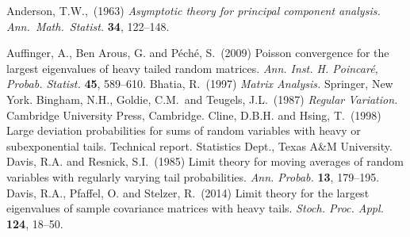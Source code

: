 \documentclass[11pt,reqno]{amsart}
\newcommand{\1}{\mathds{1}}
\newcommand{\0}{\boldsymbol{0}}
\newcommand{\4}{\mathchoice{\mskip1.5mu}{\mskip1.5mu}{}{}}
\newcommand{\5}{\mathchoice{\mskip-1.5mu}{\mskip-1.5mu}{}{}}
\newcommand{\2}{\penalty250\mskip\thickmuskip\mskip-\thinmuskip} %
\begin{document}
\begin{thebibliography}{99}
\baselineskip12pt
{\sc Anderson, T.W.,}\ (1963)
{\em Asymptotic theory for principal component analysis.}  {\em Ann.~Math.~Statist.} {\bf 34}, 122--148.

{\sc Auffinger, A., Ben Arous, G. and P\'ech\'e, S.}\ (2009)
Poisson convergence for the largest eigenvalues of heavy tailed random
matrices.
{\em Ann. Inst. H. Poincar\'e, Probab. Statist.} {\bf 45}, 589--610.
{\sc Bhatia, R.}\ (1997)
{\em Matrix Analysis.} Springer, New York.
{\sc Bingham, N.H., Goldie, C.M.\ and Teugels, J.L.}\ (1987)
{\em Regular Variation.} Cambridge University Press, Cambridge.
{\sc Cline, D.B.H. and Hsing, T.}\ (1998)
Large deviation probabilities for sums of random variables
with heavy or subexponential tails. Technical report.
Statistics Dept., Texas A\&M University. %
{\sc
Davis, R.A. and Resnick, S.I.}\ (1985)
Limit theory for moving averages of random variables
with regularly varying tail probabilities.
{\em Ann. Probab.} {\bf 13}, 179--195.
{\sc Davis, R.A., Pfaffel, O. and Stelzer, R.}\ (2014)
Limit theory for the largest eigenvalues of
sample covariance matrices with heavy tails.
{\em Stoch. Proc. Appl.} {\bf 124}, 18--50.


\end{thebibliography}
\end{document}
